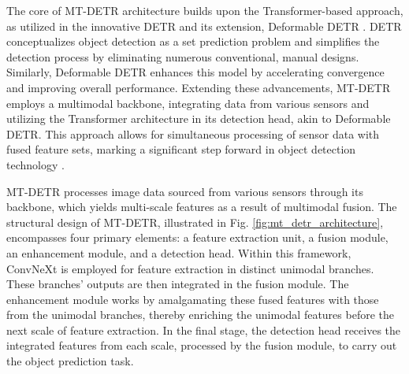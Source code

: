 \documentclass[report.tex]{subfiles}
\begin{document}

    The core of MT-DETR architecture builds upon the Transformer-based \cite{vaswani2017attention} approach, as utilized in the innovative DETR and its extension, Deformable DETR \cite{zhu2021deformable}. DETR conceptualizes object detection as a set prediction problem and simplifies the detection process by eliminating numerous conventional, manual designs. Similarly, Deformable DETR enhances this model by accelerating convergence and improving overall performance. Extending these advancements, MT-DETR employs a multimodal backbone, integrating data from various sensors and utilizing the Transformer \cite{vaswani2017attention} architecture in its detection head, akin to Deformable DETR. This approach allows for simultaneous processing of sensor data with fused feature sets, marking a significant step forward in object detection technology \cite{chu2023mt}.



    MT-DETR processes image data sourced from various sensors through its backbone, which yields multi-scale features as a result of multimodal fusion. The structural design of MT-DETR, illustrated in Fig. \ref{fig:mt_detr_architecture}, encompasses four primary elements: a feature extraction unit, a fusion module, an enhancement module, and a detection head. Within this framework, ConvNeXt \cite{liu2022convnet} is employed for feature extraction in distinct unimodal branches. These branches' outputs are then integrated in the fusion module. The enhancement module works by amalgamating these fused features with those from the unimodal branches, thereby enriching the unimodal features before the next scale of feature extraction. In the final stage, the detection head receives the integrated features from each scale, processed by the fusion module, to carry out the object prediction task.
\end{document}
